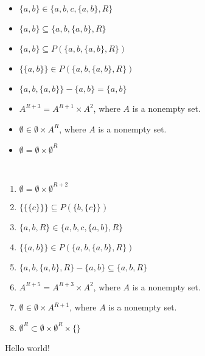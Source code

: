 \documentclass[11pt, oneside]{article}
\begin{document}
\begin{itemize}
	\item $\{a,b\}\in\{a,b,c,\{a,b\}, R \}$
	\item $\{a,b\}\subseteq\{a,b,\{a,b\}, R\}$
	\item $\{a,b\}\subseteq P(\{a,b,\{a,b\},R\})$
	\item $\{\{a,b\}\}\in P(\{a,b,\{a,b\},R\})$
	\item $\{a,b,\{a,b\}\}-\{a,b\}=\{a,b\}$
	\item $A^{R+3}=A^{R+1}\times A^2$, where $A$ is a nonempty set.
	\item $\emptyset\in\emptyset\times A^R$, where $A$ is a nonempty set.
	\item $\emptyset=\emptyset\times \emptyset^R$
\end{itemize}


\begin{question}~
\begin{enumerate}
	\item $\emptyset=\emptyset\times \emptyset^{R+2}$ %
	\item $\{\{\{c\}\}\}\subseteq P(\{b,\{c\}\})$ %
	\item $\{a,b,R\}\in\{a,b,c,\{a,b\}, R \}$ %
	\item $\{\{a,b\}\}\in P(\{a,b,\{a,b\},R\})$ %
	\item $\{a,b,\{a,b\}, R\}-\{a,b\}\subseteq\{a,b,R\}$ %
	\item $A^{R+5}=A^{R+3}\times A^2$, where $A$ is a nonempty set. %
	\item $\emptyset\in\emptyset\times A^{R+1}$, where $A$ is a nonempty set.%
	\item $\emptyset^R\subset \emptyset\times \emptyset^{R}\times\{\}$%
\end{enumerate}
\end{question}

Hello world!



\end{document}
